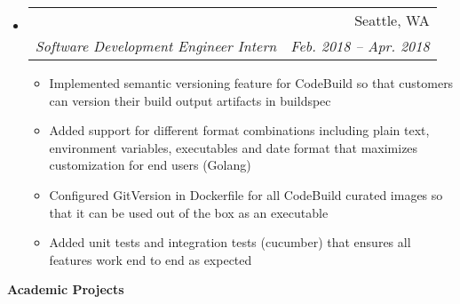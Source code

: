 \documentclass{article}
\makeatletter
\newcommand{\resitem}[1]{
    \item #1
    \vspace{-2pt}
}
\newcommand{\resheading}[1]{{\large \colorbox{mygrey}{\begin{minipage}{\textwidth}{\textbf{#1 \vphantom{p\^{E}}}}\end{minipage}}}}
\newcommand{\ressubheading}[4]{
\begin{tabular*}{6.80in}{l@{\extracolsep{\fill}}r}
    \textbf{#1} & #2 \\
    \textit{#3} & \textit{#4} \\
\end{tabular*}\vspace{-6pt}}
\makeatother
\begin{document}
\begin{itemize}
        \item
        \ressubheading
        {\href
            {https://aws.amazon.com/codebuild/}
            {Amazon Web Services - AWS CodeBuild}
        }
        {Seattle, WA}
        {Software Development Engineer Intern}
        {Feb. 2018 -- Apr. 2018}
        {\footnotesize
        \begin{itemize} %
            \resitem
            {Implemented semantic versioning feature for CodeBuild so that
             customers can version their build output artifacts in buildspec}
            \resitem
            {Added support for different format combinations including plain text, environment variables,
            executables and date format that maximizes customization for end users (Golang)}
            \resitem
            {Configured GitVersion in Dockerfile for all CodeBuild curated images so that
            it can be used out of the box as an executable}
            \resitem
            {Added unit tests and integration tests (cucumber) that ensures all features work end to end as expected}
        \end{itemize}
        }

    \end{itemize}


    \resheading{Academic Projects}
\end{document}
